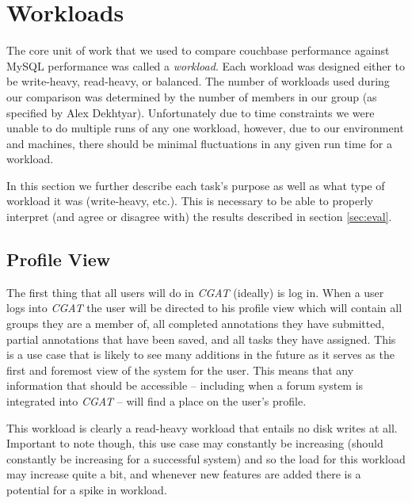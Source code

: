 \documentclass[]{IEEEtran}
\begin{document}
\clearpage

\section{Workloads}\label{sec:workload}
The core unit of work that we used to compare couchbase performance against
MySQL performance was called a \textit{workload}. Each workload was designed
either to be write-heavy, read-heavy, or balanced. The number of workloads used
during our comparison was determined by the number of members in our group (as
specified by Alex Dekhtyar). Unfortunately due to time constraints we were
unable to do multiple runs of any one workload, however, due to our environment
and machines, there should be minimal fluctuations in any given run time for a
workload.

In this section we further describe each task's purpose as well as what type of
workload it was (write-heavy, etc.). This is necessary to be able to properly
interpret (and agree or disagree with) the results described in section
\ref{sec:eval}.

\subsection{Profile View}
The first thing that all users will do in \textit{CGAT} (ideally) is log in.
When a user logs into \textit{CGAT} the user will be directed to his profile
view which will contain all groups they are a member of, all completed
annotations they have submitted, partial annotations that have been saved, and
all tasks they have assigned. This is a use case that is likely to see many
additions in the future as it serves as the first and foremost view of the
system for the user. This means that any information that should be accessible
-- including when a forum system is integrated into \textit{CGAT} -- will find
a place on the user's profile.

This workload is clearly a read-heavy workload that entails no disk writes at
all. Important to note though, this use case may constantly be increasing
(should constantly be increasing for a successful system) and so the load for
this workload may increase quite a bit, and whenever new features are added
there is a potential for a spike in workload.

\end{document}
